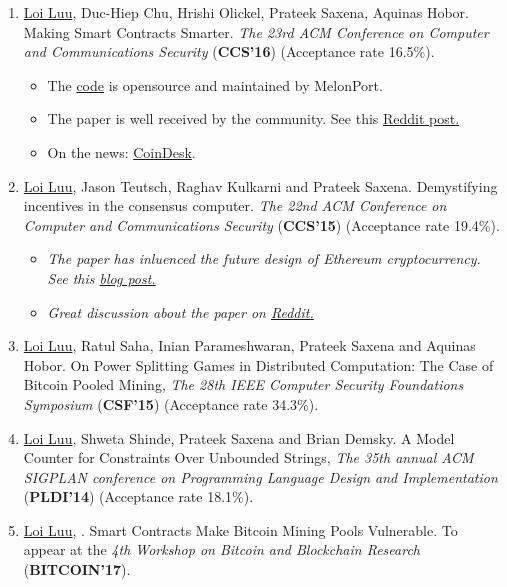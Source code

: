 \documentclass[margin,line]{res}
\begin{document}
\begin{resume}
\begin{enumerate}
  \item \underline{Loi Luu}, Duc-Hiep Chu, Hrishi Olickel, Prateek Saxena, Aquinas Hobor. Making Smart Contracts Smarter. 
  \emph{The 23rd ACM Conference on Computer and Communications Security} (\textbf{CCS'16}) (Acceptance rate 16.5\%).
  \begin{itemize}
    \item The \href{https://github.com/melonproject/oyente}{code} is opensource and maintained by MelonPort.
    \item The paper is well received by the community. See this \href{https://www.reddit.com/r/ethereum/comments/4p52qd/new_paper_making_smart_contracts_smarter/}{Reddit post.}
    \item On the news: \href{http://coindesk.com/smart-contract-debugger-debut-ethereum-conference/}{CoinDesk}.
  \end{itemize}

  \item \underline{Loi Luu}, Jason Teutsch, Raghav Kulkarni and Prateek Saxena. Demystifying incentives in the consensus computer. \emph{The 22nd ACM Conference on Computer and Communications Security} (\textbf{CCS'15}) (Acceptance rate 19.4\%).
  \begin{itemize}
    \item \textit{The paper has inluenced the future design of Ethereum cryptocurrency. See this \href{https://blog.ethereum.org/2016/05/09/on-settlement-finality/}{blog post.}}
                    
    \item \textit{Great discussion about the paper on \href{https://www.reddit.com/r/ethereum/comments/3fcw0i/verifiers_dilemma_renders_ethereum_nonincentive/}{Reddit.}}
  \end{itemize}
  \item \underline{Loi Luu}, Ratul Saha, Inian Parameshwaran, Prateek Saxena and Aquinas Hobor. On Power Splitting Games in Distributed Computation: The Case of Bitcoin Pooled Mining, \emph{The 28th IEEE Computer Security Foundations Symposium} (\textbf{CSF'15}) (Acceptance rate 34.3\%).  

  \item \underline{Loi Luu}, Shweta Shinde, Prateek Saxena and Brian Demsky. A Model Counter for Constraints Over Unbounded Strings, \emph{The 35th annual ACM SIGPLAN conference on Programming Language Design and Implementation} (\textbf{PLDI'14}) (Acceptance rate 18.1\%).

  \item \underline{Loi Luu}, . Smart Contracts Make Bitcoin Mining Pools Vulnerable. To appear at the \emph{4th Workshop on Bitcoin and Blockchain Research} (\textbf{BITCOIN'17}).


\end{enumerate}
\end{resume}
\end{document}
